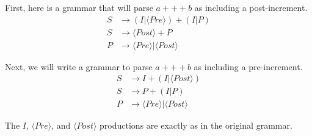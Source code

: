 \documentclass[letterpaper,11pt]{article}
\begin{document}
\begin{enumerate}
        First, here is a grammar that will parse $a+++b$ as including a
        post-increment.
        \begin{align*}
            S &\to (I | \langle Pre \rangle) + (I | P ) \\
            S &\to \langle Post \rangle + P \\
            P &\to \langle Pre \rangle | \langle Post \rangle
        \end{align*}

        Next, we will write a grammar to parse $a+++b$ as including a
        pre-increment.
        \begin{align*}
            S &\to I + ( I | \langle Post \rangle ) \\
            S &\to P + (I | P) \\
            P &\to \langle Pre \rangle | \langle Post \rangle
        \end{align*}

        The $I$, $\langle Pre \rangle$, and $\langle Post \rangle$ productions
        are exactly as in the original grammar.

\end{enumerate}
\end{document}
